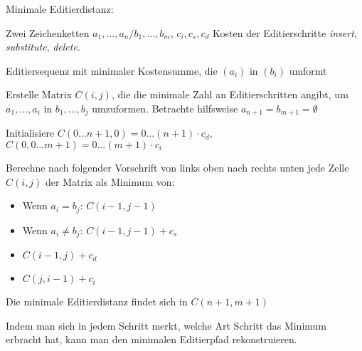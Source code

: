 \algorithm Minimale Editierdistanz:{
  \given Zwei Zeichenketten $a_1,\ldots,a_n/b_1,\ldots,b_m$, $c_i,c_s,c_d$
    Kosten der Editierschritte \textit{insert}, \textit{substitute},
    \textit{delete}.

  \aim Editiersequenz mit minimaler Kostensumme, die $(a_i)$ in $(b_i)$ umformt
  
  \begin{proc}
    \item Erstelle Matrix $C(i,j)$, die die minimale Zahl an Editierschritten 
      angibt, um $a_1,\ldots, a_i$ in $b_1,\ldots, b_j$ umzuformen.
      Betrachte hilfsweise $a_{n+1}=b_{m+1}=\emptyset$
    \item Initialisiere $C(0\ldots n+1,0)=0\ldots (n+1)\cdot c_d$, 
      $C(0,0\ldots m+1)=0\ldots (m+1)\cdot c_i$
    \item Berechne nach folgender Vorschrift von links oben nach rechts unten
      jede Zelle $C(i,j)$ der Matrix als Minimum von:
      \begin{itemize}
        \item Wenn $a_i=b_j$: $C(i-1,j-1)$
        \item Wenn $a_i\ne b_j$: $C(i-1,j-1)+c_s$
        \item $C(i-1,j)+c_d$
        \item $C(j,i-1)+c_i$
      \end{itemize}
    \item Die minimale Editierdistanz findet sich in $C(n+1,m+1)$
  \end{proc}
  
  Indem man sich in jedem Schritt merkt, welche Art Schritt das Minimum
  erbracht hat, kann man den minimalen Editierpfad rekonstruieren.
}
